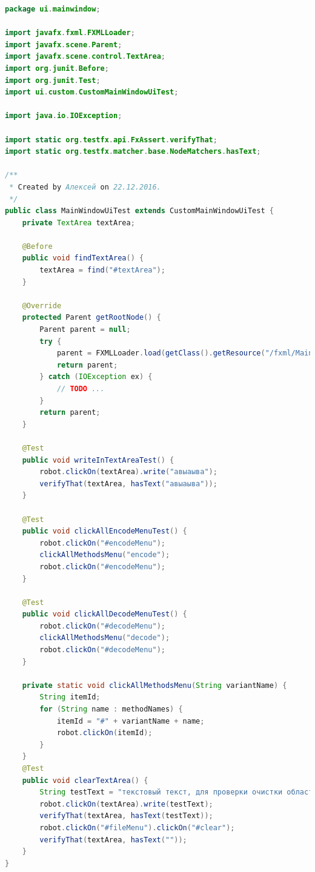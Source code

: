 \documentclass[a4paper,12pt]{article}
\begin{document}
\begin{lstlisting}[language=java, caption=код модуля MainWindowUiTest.java]
package ui.mainwindow;

import javafx.fxml.FXMLLoader;
import javafx.scene.Parent;
import javafx.scene.control.TextArea;
import org.junit.Before;
import org.junit.Test;
import ui.custom.CustomMainWindowUiTest;

import java.io.IOException;

import static org.testfx.api.FxAssert.verifyThat;
import static org.testfx.matcher.base.NodeMatchers.hasText;

/**
 * Created by Алексей on 22.12.2016.
 */
public class MainWindowUiTest extends CustomMainWindowUiTest {
    private TextArea textArea;

    @Before
    public void findTextArea() {
        textArea = find("#textArea");
    }

    @Override
    protected Parent getRootNode() {
        Parent parent = null;
        try {
            parent = FXMLLoader.load(getClass().getResource("/fxml/MainWindow.fxml"));
            return parent;
        } catch (IOException ex) {
            // TODO ...
        }
        return parent;
    }

    @Test
    public void writeInTextAreaTest() {
        robot.clickOn(textArea).write("авыаыва");
        verifyThat(textArea, hasText("авыаыва"));
    }

    @Test
    public void clickAllEncodeMenuTest() {
        robot.clickOn("#encodeMenu");
        clickAllMethodsMenu("encode");
        robot.clickOn("#encodeMenu");
    }

    @Test
    public void clickAllDecodeMenuTest() {
        robot.clickOn("#decodeMenu");
        clickAllMethodsMenu("decode");
        robot.clickOn("#decodeMenu");
    }

    private static void clickAllMethodsMenu(String variantName) {
        String itemId;
        for (String name : methodNames) {
            itemId = "#" + variantName + name;
            robot.clickOn(itemId);
        }
    }
    @Test
    public void clearTextArea() {
        String testText = "текстовый текст, для проверки очистки области ввода текста";
        robot.clickOn(textArea).write(testText);
        verifyThat(textArea, hasText(testText));
        robot.clickOn("#fileMenu").clickOn("#clear");
        verifyThat(textArea, hasText(""));
    }
}
\end{lstlisting}
\end{document}
